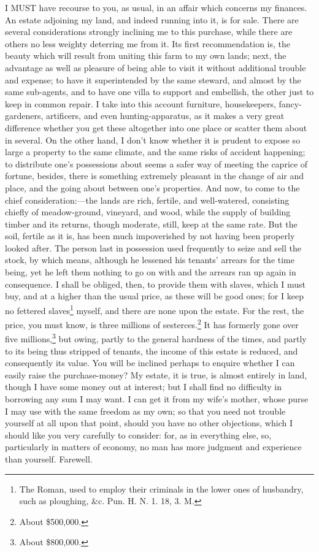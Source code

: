 I MUST have recourse to you, as usual, in an affair which concerns my
finances. An estate adjoining my land, and indeed running into it, is for
sale. There are several considerations strongly inclining me to this
purchase, while there are others no less weighty deterring me from it. Its
first recommendation is, the beauty which will result from uniting this
farm to my own lands; next, the advantage as well as pleasure of being
able to visit it without additional trouble and expense; to have it
superintended by the same steward, and almost by the same sub-agents, and
to have one villa to support and embellish, the other just to keep in
common repair. I take into this account furniture, housekeepers,
fancy-gardeners, artificers, and even hunting-apparatus, as it makes a
very great difference whether you get these altogether into one place or
scatter them about in several. On the other hand, I don't know whether it
is prudent to expose so large a property to the same climate, and the same
risks of accident happening; to distribute one's possessions about seems a
safer way of meeting the caprice of fortune, besides, there is something
extremely pleasant in the change of air and place, and the going about
between one's properties. And now, to come to the chief consideration:—the
lands are rich, fertile, and well-watered, consisting chiefly of
meadow-ground, vineyard, and wood, while the supply of building timber and
its returns, though moderate, still, keep at the same rate. But the soil,
fertile as it is, has been much impoverished by not having been properly
looked after. The person last in possession used frequently to seize and
sell the stock, by which means, although he lessened his tenants' arrears
for the time being, yet he left them nothing to go on with and the arrears
ran up again in consequence. I shall be obliged, then, to provide them
with slaves, which I must buy, and at a higher than the usual price, as
these will be good ones; for I keep no fettered slaves\footnote{The Roman, used to employ
their criminals in the lower ones of husbandry, such as ploughing, \&c.
Pun. H. N. 1. 18, 3. M.}
myself, and there are none upon the estate. For the rest, the price, you
must know, is three millions of sesterces.\footnote{About \$500,000.} It has formerly gone
over five millions,\footnote{About \$800,000.} but owing, partly to the general hardness of
the times, and partly to its being thus stripped of tenants, the income of
this estate is reduced, and consequently its value. You will be inclined
perhaps to enquire whether I can easily raise the purchase-money? My
estate, it is true, is almost entirely in land, though I have some money
out at interest; but I shall find no difficulty in borrowing any sum I may
want. I can get it from my wife's mother, whose purse I may use with the
same freedom as my own; so that you need not trouble yourself at all upon
that point, should you have no other objections, which I should like you
very carefully to consider: for, as in everything else, so, particularly
in matters of economy, no man has more judgment and experience than
yourself. Farewell.

